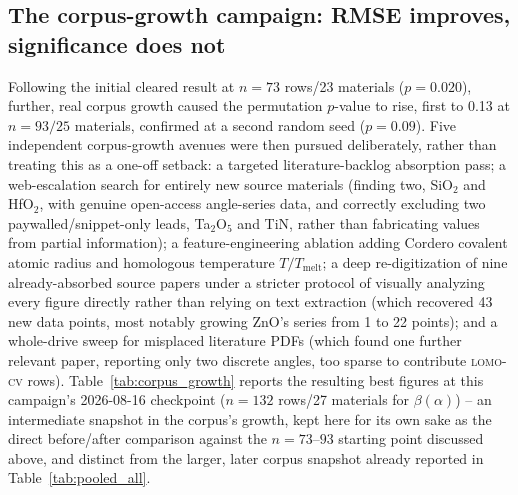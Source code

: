 \documentclass[aip,amsmath,amssymb,reprint]{revtex4-1}
\newcommand{\lomo}{\textsc{lomo-cv}}
\begin{document}
\subsection{The corpus-growth campaign: RMSE improves, significance does not}
\label{ssec:corpus_growth}

Following the initial cleared result at $n=73$ rows/23 materials
($p=0.020$), further, real corpus growth caused the permutation
$p$-value to rise, first to 0.13 at $n=93/25$ materials, confirmed at
a second random seed ($p=0.09$). Five independent corpus-growth
avenues were then pursued deliberately, rather than treating this as
a one-off setback: a targeted literature-backlog absorption pass; a
web-escalation search for entirely new source materials (finding two,
SiO$_2$ and HfO$_2$, with genuine open-access angle-series data, and
correctly excluding two paywalled/snippet-only leads, Ta$_2$O$_5$ and
TiN, rather than fabricating values from partial information); a
feature-engineering ablation adding Cordero covalent atomic radius and
homologous temperature $T/T_{\mathrm{melt}}$; a deep re-digitization of
nine already-absorbed source papers under a stricter protocol of
visually analyzing every figure directly rather than relying on text
extraction (which recovered 43 new data points, most notably growing
ZnO's series from 1 to 22 points); and a whole-drive sweep for
misplaced literature PDFs (which found one further relevant paper,
reporting only two discrete angles, too sparse to contribute \lomo{}
rows). Table~\ref{tab:corpus_growth} reports the resulting best figures at
this campaign's 2026-08-16 checkpoint ($n=132$ rows/27 materials for
$\beta(\alpha)$) -- an intermediate snapshot in the corpus's growth, kept
here for its own sake as the direct before/after comparison against the
$n=73$--$93$ starting point discussed above, and distinct from the larger,
later corpus snapshot already reported in
Table~\ref{tab:pooled_all}.
\end{document}
